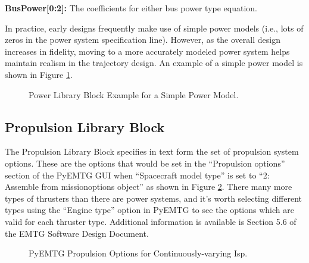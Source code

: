 \documentclass[11pt]{article}
\begin{document}
\noindent \textbf{BusPower[0:2]:} The coefficients for either bus power type equation. 

\noindent In practice, early designs frequently make use of simple power models (i.e., lots of zeros in the power system specification line). However, as the overall design increases in fidelity, moving to a more accurately modeled power system helps maintain realism in the trajectory design. An example of a simple power model is shown in Figure \ref{fig:simple_power_model}.

\begin{figure}[H]
	\centering
	\caption{\label{fig:simple_power_model}Power Library Block Example for a Simple Power Model.}
\end{figure}

\subsection{Propulsion Library Block}
\label{sec:propulsion_library_block}

The Propulsion Library Block specifies in text form the set of propulsion system options. These are the options that would be set in the ``Propulsion options'' section of the PyEMTG \acs{GUI} when ``Spacecraft model type'' is set to ``2: Assemble from missionoptions object'' as shown in Figure \ref{fig:prop_options_continuous_isp}. There many more types of thrusters than there are power systems, and it’s worth selecting different types using the ``Engine type'' option in PyEMTG to see the options which are valid for each thruster type. Additional information is available is Section 5.6 of the \ac{EMTG} Software Design Document.

\begin{figure}
	\centering
	\caption{\label{fig:prop_options_continuous_isp}PyEMTG Propulsion Options for Continuously-varying Isp.}
\end{figure}
\end{document}
